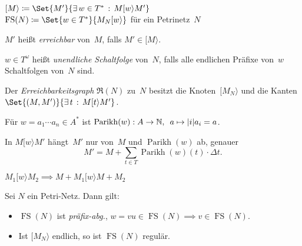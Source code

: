 \documentclass{cheat-sheet}
\newcommand{\activeTransition}[1]{[{#1}\rangle} %
\DeclareMathOperator{\FS}{FS} %
\newcommand{\ReachabilityGraph}{\mathfrak{R}} %
\DeclareMathOperator{\Parikh}{Parikh} %
\begin{document}
\begin{nota}
  \begin{minipage}[t]{0.8 \linewidth}
    $\activeTransition{M} \coloneqq \Set{M'}{\ex{w \in T^{*}} M \activeTransition{w} M'}$ \\
    $\FS(N) \coloneqq \Set{w \in T^{*}}{M_N \activeTransition{w}}$ \enspace
    für ein Petrinetz~$N$
  \end{minipage}
\end{nota}

\begin{defn}
  $M'$ heißt \emph{erreichbar} von~$M$, falls $M' \in \activeTransition{M}$.
\end{defn}

\begin{defn}
  $w \in T^\omega$ heißt \emph{unendliche Schaltfolge} von~$N$, falls alle endlichen Präfixe von~$w$ Schaltfolgen von~$N$ sind.
\end{defn}

\begin{defn}
  Der \emph{Erreichbarkeitsgraph} $\ReachabilityGraph(N)$ zu~$N$ besitzt die Knoten~$\activeTransition{M_N}$ und die Kanten $\Set{(M, M')}{\ex{t} M \activeTransition{t} M'}$.
\end{defn}

\begin{defn}
  Für $w = a_1 \cdots a_n \in A^{*}$ ist $\Parikh(w) : A \to \N, \enspace a \mapsto \card{i}{a_i = a}$.
\end{defn}

\begin{lem}
  In $M \activeTransition{w} M'$ hängt~$M'$ nur von~$M$ und $\Parikh(w)$ ab, genauer
  \[
    M' = M + {\sum}_{t \in T} \Parikh(w)(t) \cdot \Delta t.
  \]
\end{lem}

\begin{lem}
  $M_1 \activeTransition{w} M_2 \implies M + M_1 \activeTransition{w} M + M_2$
\end{lem}


\begin{lem}
  Sei $N$ ein Petri-Netz.
  Dann gilt:
  \begin{itemize}
    \item $\FS(N)$ ist \textit{präfix-abg.}, \dh{} $w = v u \in \FS(N) \implies v \in \FS(N)$.
    \item Ist $\activeTransition{M_N}$ endlich, so ist $\FS(N)$ regulär.
  \end{itemize}
\end{lem}
\end{document}
